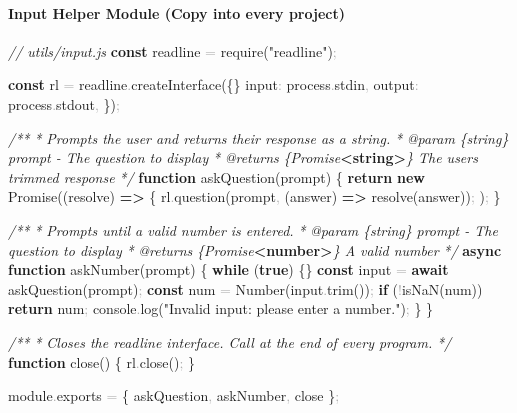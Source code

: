 \documentclass[
  justified,
  openright,
]{tufte-book}
\let\subsection\paragraph
\let\paragraph\paragraph
\newcommand{\KeywordTok}[1]{\textcolor{CodeKeyword}{\textbf{#1}}}  %
\newcommand{\StringTok}[1]{\textcolor{CodeString}{#1}}              %
\newcommand{\CommentTok}[1]{\textcolor{CodeComment}{\textit{#1}}}  %
\newcommand{\CodeFuncTok}[1]{\textcolor{CodeKeyword}{#1}}           %
\newcommand{\CodeTypeTok}[1]{\textcolor{CodeType}{#1}}              %
\newcommand{\CodeAccentTok}[1]{\textcolor{CodeAccent}{#1}}          %
\newcommand{\OperatorTok}[1]{\textcolor{DarkGray}{#1}}              %
\newenvironment{Shaded}{%
  \begin{mdframed}[style=TufteCode]%
}{%
  \end{mdframed}%
}
\let\subsection\paragraph
\let\paragraph\paragraph
\begin{document}
\subsection{Input Helper Module (Copy into every
project)}\label{input-helper-module-copy-into-every-project}

\begin{Shaded}
\begin{Highlighting}[]
\CommentTok{// utils/input.js}
\KeywordTok{const} readline \OperatorTok{=} \CodeAccentTok{require}(\StringTok{"readline"})\OperatorTok{;}
 
\KeywordTok{const} rl \OperatorTok{=} readline\OperatorTok{.}\CodeFuncTok{createInterface}(\{\}
  \CodeTypeTok{input}\OperatorTok{:} process\OperatorTok{.}\CodeTypeTok{stdin}\OperatorTok{,}
  \CodeTypeTok{output}\OperatorTok{:} process\OperatorTok{.}\CodeTypeTok{stdout}\OperatorTok{,}
\})\OperatorTok{;}
 
\CommentTok{/**}
\CommentTok{ * Prompts the user and returns their response as a string.}
\CommentTok{ * }\CommentTok{@param}\CommentTok{ }\CommentTok{\{string\}}\CommentTok{ prompt {-} The question to display}
\CommentTok{ * }\CommentTok{@returns}\CommentTok{ \{Promise}\KeywordTok{\textless{}string\textgreater{}}\CommentTok{\} The user\textquotesingle{}s trimmed response}
\CommentTok{ */}
\KeywordTok{function} \CodeFuncTok{askQuestion}(prompt) \{
  \KeywordTok{return} \KeywordTok{new} Promise((resolve) \KeywordTok{=\textgreater{}} \{
    rl\OperatorTok{.}\CodeFuncTok{question}(prompt\OperatorTok{,} (answer) \KeywordTok{=\textgreater{}} \CodeFuncTok{resolve}(answer))\OperatorTok{;}
  )\OperatorTok{;}
\}
 
\CommentTok{/**}
\CommentTok{ * Prompts until a valid number is entered.}
\CommentTok{ * }\CommentTok{@param}\CommentTok{ }\CommentTok{\{string\}}\CommentTok{ prompt {-} The question to display}
\CommentTok{ * }\CommentTok{@returns}\CommentTok{ \{Promise}\KeywordTok{\textless{}number\textgreater{}}\CommentTok{\} A valid number}
\CommentTok{ */}
\KeywordTok{async} \KeywordTok{function} \CodeFuncTok{askNumber}(prompt) \{
  \KeywordTok{while} (\KeywordTok{true}) \{\}
    \KeywordTok{const} input \OperatorTok{=} \KeywordTok{await} \CodeFuncTok{askQuestion}(prompt)\OperatorTok{;}
    \KeywordTok{const} num \OperatorTok{=} Number(input\OperatorTok{.}\CodeFuncTok{trim}())\OperatorTok{;}
    \KeywordTok{if} (\OperatorTok{!}\CodeAccentTok{isNaN}(num)) \KeywordTok{return} num\OperatorTok{;}
    console\OperatorTok{.}\CodeFuncTok{log}(\StringTok{"Invalid input: please enter a number."})\OperatorTok{;}
  \}
\}
 
\CommentTok{/**}
\CommentTok{ * Closes the readline interface. Call at the end of every program.}
\CommentTok{ */}
\KeywordTok{function} \CodeFuncTok{close}() \{
  rl\OperatorTok{.}\CodeFuncTok{close}()\OperatorTok{;}
\}
 
module\OperatorTok{.}\CodeTypeTok{exports} \OperatorTok{=} \{ askQuestion\OperatorTok{,} askNumber\OperatorTok{,} close \}\OperatorTok{;}
\end{Highlighting}
\end{Shaded}
\end{document}
